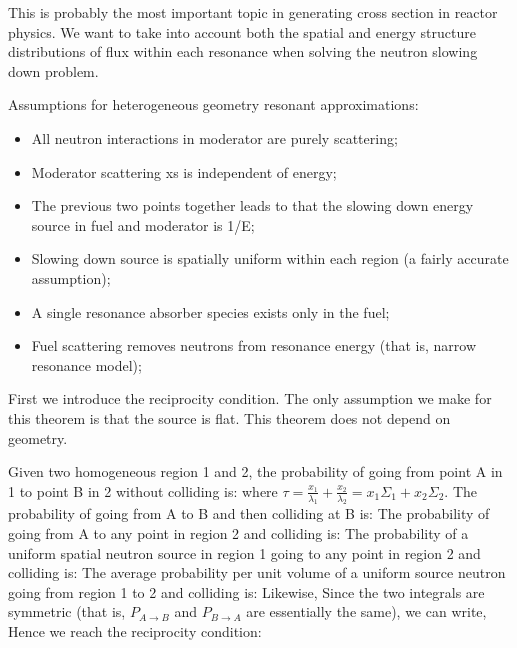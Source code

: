 \documentclass{school-22.211-notes}
\date{March  5, 2012}
\begin{document}
\maketitle

\clearpage
{}
This is probably the most important topic in generating cross section in reactor physics. We want to take into account both the spatial and energy structure distributions of flux within each resonance when solving the neutron slowing down problem. 

Assumptions for heterogeneous geometry resonant approximations:
\begin{itemize}
\item All neutron interactions in moderator are purely scattering;
\item Moderator scattering xs is independent of energy;
\item The previous two points together leads to that the slowing down energy source in fuel and moderator is 1/E;
\item Slowing down source is spatially uniform within each region (a fairly accurate assumption);
\item A single resonance absorber species exists only in the fuel;
\item Fuel scattering removes neutrons from resonance energy (that is, narrow resonance model); 
\end{itemize}

First we introduce the reciprocity condition. The only assumption we make for this theorem is that the source is flat. This theorem does not depend on geometry. 

Given two homogeneous region 1 and 2, the probability of going from point A in 1 to point B in 2 without colliding is:
where $\tau = \frac{x_1}{\lambda_1} + \frac{x_2}{\lambda_2} = x_1 \Sigma_1 + x_2 \Sigma_2$. The probability of going from A to B and then colliding at B is: 
The probability of going from A to any point in region 2 and colliding is:
The probability of a uniform spatial neutron source in region 1 going to any point in region 2 and colliding is:
The average probability per unit volume of a uniform source neutron going from region 1 to 2 and colliding is:
Likewise,
Since the two integrals are symmetric (that is, $P_{A\to B}$ and $P_{B \to A}$ are essentially the same), we can write,
Hence we reach the reciprocity condition:
\end{document}
